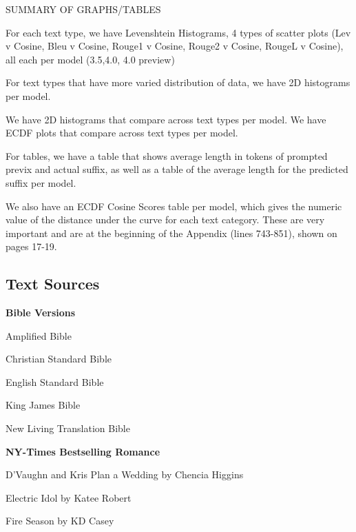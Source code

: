 \documentclass{article}
\begin{document}
SUMMARY OF GRAPHS/TABLES

For each text type, we have Levenshtein Histograms, 4 types of scatter plots (Lev v Cosine, Bleu v Cosine, Rouge1 v Cosine, Rouge2 v Cosine, RougeL v Cosine), all each per model (3.5,4.0, 4.0 preview)

For text types that have more varied distribution of data, we have 2D histograms per model. 

We have 2D histograms that compare across text types per model.
We have ECDF plots that compare across text types per model. 

For tables, we have a table that shows average length in tokens of prompted previx and actual suffix, as well as a table of the average length for the predicted suffix per model. 

We also have an ECDF Cosine Scores table per model, which gives the numeric value of the distance under the curve for each text category. These are very important and are at the beginning of the Appendix (lines 743-851), shown on pages 17-19. 










\subsection{Text Sources}

\textbf{Bible Versions}

Amplified Bible

Christian Standard Bible

English Standard Bible

King James Bible

New Living Translation Bible


\textbf{NY-Times Bestselling Romance}

D'Vaughn and Kris Plan a Wedding by Chencia Higgins

Electric Idol by Katee Robert

Fire Season by KD Casey
\end{document}
